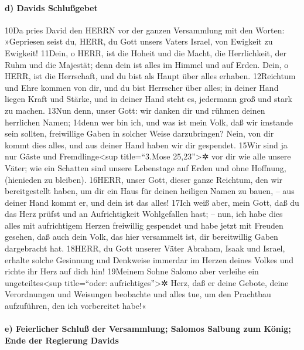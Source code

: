 \hypertarget{d-davids-schluuxdfgebet}{%
\paragraph{d) Davids Schlußgebet}\label{d-davids-schluuxdfgebet}}

10Da pries David den HERRN vor der ganzen Versammlung mit den Worten:
»Gepriesen seist du, HERR, du Gott unsers Vaters Israel, von Ewigkeit zu
Ewigkeit! 11Dein, o HERR, ist die Hoheit und die Macht, die
Herrlichkeit, der Ruhm und die Majestät; denn dein ist alles im Himmel
und auf Erden. Dein, o HERR, ist die Herrschaft, und du bist als Haupt
über alles erhaben. 12Reichtum und Ehre kommen von dir, und du bist
Herrscher über alles; in deiner Hand liegen Kraft und Stärke, und in
deiner Hand steht es, jedermann groß und stark zu machen. 13Nun denn,
unser Gott: wir danken dir und rühmen deinen herrlichen Namen; 14denn
wer bin ich, und was ist mein Volk, daß wir imstande sein sollten,
freiwillige Gaben in solcher Weise darzubringen? Nein, von dir kommt
dies alles, und aus deiner Hand haben wir dir gespendet. 15Wir sind ja
nur Gäste und Fremdlinge\textless sup title=``3.Mose
25,23''\textgreater✲ vor dir wie alle unsere Väter; wie ein Schatten
sind unsere Lebenstage auf Erden und ohne Hoffnung, (hienieden zu
bleiben). 16HERR, unser Gott, dieser ganze Reichtum, den wir
bereitgestellt haben, um dir ein Haus für deinen heiligen Namen zu
bauen, -- aus deiner Hand kommt er, und dein ist das alles! 17Ich weiß
aber, mein Gott, daß du das Herz prüfst und an Aufrichtigkeit
Wohlgefallen hast; -- nun, ich habe dies alles mit aufrichtigem Herzen
freiwillig gespendet und habe jetzt mit Freuden gesehen, daß auch dein
Volk, das hier versammelt ist, dir bereitwillig Gaben dargebracht hat.
18HERR, du Gott unserer Väter Abraham, Isaak und Israel, erhalte solche
Gesinnung und Denkweise immerdar im Herzen deines Volkes und richte ihr
Herz auf dich hin! 19Meinem Sohne Salomo aber verleihe ein
ungeteiltes\textless sup title=``oder: aufrichtiges''\textgreater✲ Herz,
daß er deine Gebote, deine Verordnungen und Weisungen beobachte und
alles tue, um den Prachtbau aufzuführen, den ich vorbereitet habe!«

\hypertarget{e-feierlicher-schluuxdf-der-versammlung-salomos-salbung-zum-kuxf6nig-ende-der-regierung-davids}{%
\paragraph{e) Feierlicher Schluß der Versammlung; Salomos Salbung zum
König; Ende der Regierung
Davids}\label{e-feierlicher-schluuxdf-der-versammlung-salomos-salbung-zum-kuxf6nig-ende-der-regierung-davids}}

